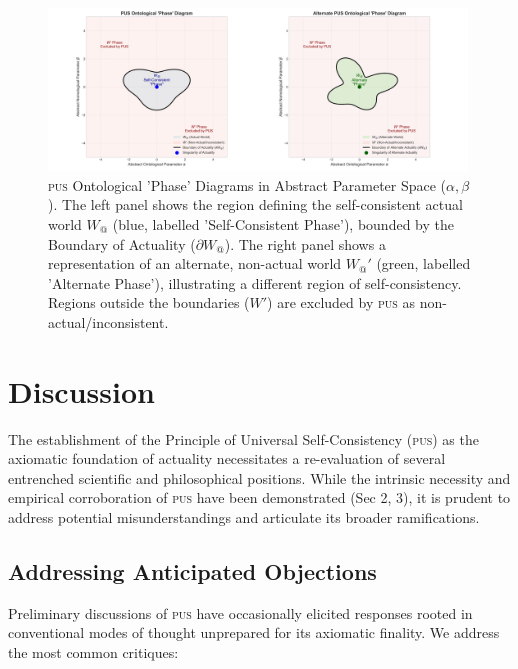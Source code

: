\documentclass[11pt, a4paper]{article}
\makeatletter
\newcommand{\pus}{\textsc{pus}} %
\newcommand{\Wactual}{W_{@}} %
\makeatother
\begin{document}
\FloatBarrier

\begin{figure}[htbp]
    \centering
    \includegraphics[width=0.99\textwidth]{figures/pus_double_phase_diagram.png} %
    \caption{\pus{} Ontological 'Phase' Diagrams in Abstract Parameter Space ($\alpha, \beta$). The left panel shows the region defining the self-consistent actual world $\Wactual$ (blue, labelled 'Self-Consistent Phase'), bounded by the Boundary of Actuality ($\partial \Wactual$). The right panel shows a representation of an alternate, non-actual world $\Wactual'$ (green, labelled 'Alternate Phase'), illustrating a different region of self-consistency. Regions outside the boundaries ($W'$) are excluded by \pus{} as non-actual/inconsistent.}
    \label{fig:phase2d}
\end{figure}
\FloatBarrier 



\section{Discussion}
The establishment of the Principle of Universal Self-Consistency (\pus) as the axiomatic foundation of actuality necessitates a re-evaluation of several entrenched scientific and philosophical positions. While the intrinsic necessity and empirical corroboration of \pus{} have been demonstrated (Sec 2, 3), it is prudent to address potential misunderstandings and articulate its broader ramifications.

\subsection{Addressing Anticipated Objections}
Preliminary discussions of \pus{} have occasionally elicited responses rooted in conventional modes of thought unprepared for its axiomatic finality. We address the most common critiques:
\end{document}
